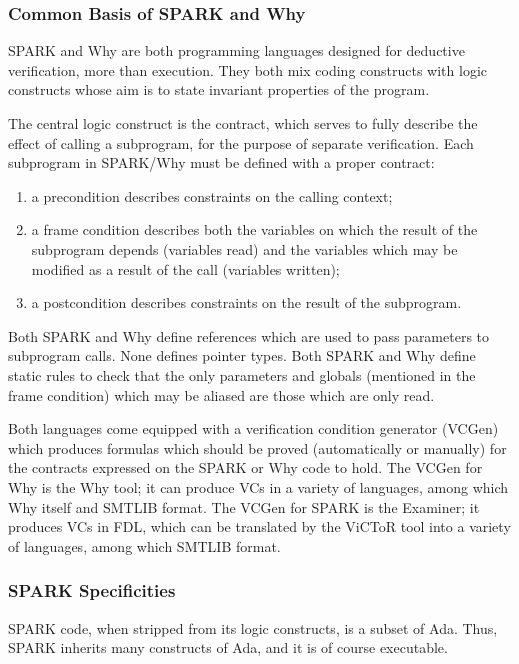 \documentclass{article}
\begin{document}
\subsubsection{Common Basis of SPARK and Why}

SPARK and Why are both programming languages designed for deductive
verification, more than execution. They both mix coding constructs with logic
constructs whose aim is to state invariant properties of the program.

The central logic construct is the contract, which serves to fully describe the
effect of calling a subprogram, for the purpose of separate verification. Each
subprogram in SPARK/Why must be defined with a proper contract:
\begin{enumerate}
\item a precondition describes constraints on the calling context;
\item a frame condition describes both the variables on which the result of the
  subprogram depends (variables read) and the variables which may be modified
  as a result of the call (variables written);
\item a postcondition describes constraints on the result of the subprogram.
\end{enumerate}

Both SPARK and Why define references which are used to pass parameters to
subprogram calls. None defines pointer types. Both SPARK and Why define static
rules to check that the only parameters and globals (mentioned in the frame
condition) which may be aliased are those which are only read.

Both languages come equipped with a verification condition generator (VCGen)
which produces formulas which should be proved (automatically or manually) for
the contracts expressed on the SPARK or Why code to hold. The VCGen for Why is
the Why tool; it can produce VCs in a variety of languages, among which Why
itself and SMTLIB format.  The VCGen for SPARK is the Examiner; it produces VCs
in FDL, which can be translated by the ViCToR tool into a variety of languages,
among which SMTLIB format.

\subsubsection{SPARK Specificities}

SPARK code, when stripped from its logic constructs, is a subset of
Ada. Thus, SPARK inherits many constructs of Ada, and it is of course
executable.
\end{document}
